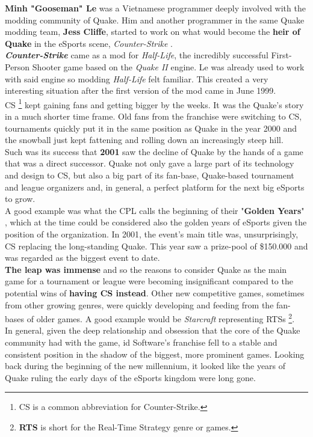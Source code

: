 \textbf{Minh "Gooseman" Le} \citep{gooseman} was a Vietnamese programmer deeply involved with the modding community of Quake. Him and another programmer in the same Quake modding team, \textbf{Jess Cliffe}, started to work on what would become the \textbf{heir of Quake} in the eSports scene, \textit{Counter-Strike} \citep{game:cs}.\\

\textit{\textbf{Counter-Strike}} came as a mod for \textit{Half-Life}, the incredibly successful First-Person Shooter game based on the \textit{Quake II} engine. Le was already used to work with said engine so modding \textit{Half-Life} felt familiar. This created a very interesting situation after the first version of the mod came in June 1999.\\

CS \footnote{CS is a common abbreviation for Counter-Strike.} kept gaining fans and getting bigger by the weeks. It was the Quake's story in a much shorter time frame. Old fans from the franchise were switching to CS, tournaments quickly put it in the same position as Quake in the year 2000 and the snowball just kept fattening and rolling down an increasingly steep hill.\\

Such was its success that \textbf{2001} saw the decline of Quake by the hands of a game that was a direct successor. Quake not only gave a large part of its technology and design to CS, but also a big part of its fan-base, Quake-based tournament and league organizers and, in general, a perfect platform for the next big eSports to grow.\\

A good example was what the CPL calls the beginning of their "\textbf{Golden Years}" \citep{web:cpl}, which at the time could be considered also the golden years of eSports given the position of the organization. In 2001, the event's main title was, unsurprisingly, CS replacing the long-standing Quake. This year saw a prize-pool of \$150.000 and was regarded as the biggest event to date.\\

\textbf{The leap was immense} and so the reasons to consider Quake as the main game for a tournament or league were becoming insignificant compared to the potential wins of \textbf{having CS instead}. Other new competitive games, sometimes from other growing genres, were quickly developing and feeding from the fan-bases of older games. A good example would be \textit{Starcraft} \citep{game:starcraft} representing RTSs \footnote{\textbf{RTS} is short for the Real-Time Strategy genre or games.}.\\

In general, given the deep relationship and obsession that the core of the Quake community had with the game, id Software's franchise fell to a stable and consistent position in the shadow of the biggest, more prominent games. Looking back during the beginning of the new millennium, it looked like the years of Quake ruling the early days of the eSports kingdom were long gone.
